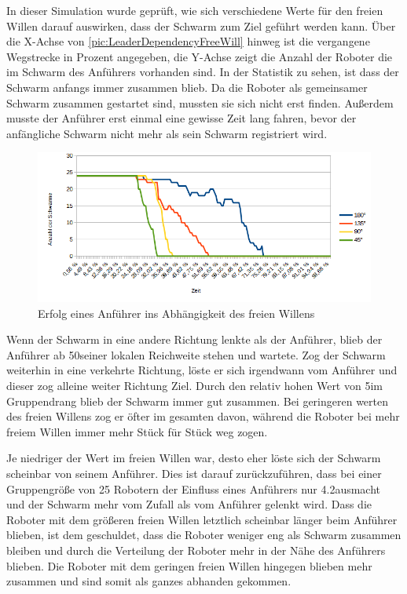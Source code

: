 In dieser Simulation wurde geprüft, wie sich verschiedene Werte für den freien Willen darauf auswirken, dass der Schwarm zum Ziel geführt werden kann. Über die X-Achse von \autoref{pic:LeaderDependencyFreeWill} hinweg ist die vergangene Wegstrecke in Prozent angegeben, die Y-Achse zeigt die Anzahl der Roboter die im Schwarm des Anführers vorhanden sind.
In der Statistik zu sehen, ist dass der Schwarm anfangs immer zusammen blieb. Da die Roboter als gemeinsamer Schwarm zusammen gestartet sind, mussten sie sich nicht erst finden. Außerdem musste der Anführer erst einmal eine gewisse Zeit lang fahren, bevor der anfängliche Schwarm nicht mehr als sein Schwarm registriert wird.

\begin{figure}[h]
	\includegraphics[width=\textwidth, keepaspectratio]{graphics/Statistics/Leader/DependencyFreeWill.png}
	\caption{Erfolg eines Anführer ins Abhängigkeit des freien Willens}
	\label{pic:LeaderDependencyFreeWill}
\end{figure}

Wenn der Schwarm in eine andere Richtung lenkte als der Anführer, blieb der Anführer ab 50\per seiner lokalen Reichweite stehen und wartete. Zog der Schwarm weiterhin in eine verkehrte Richtung, löste er sich irgendwann vom Anführer und dieser zog alleine weiter Richtung Ziel. Durch den relativ hohen Wert von 5\per im Gruppendrang blieb der Schwarm immer gut zusammen. Bei geringeren werten des freien Willens zog er öfter im gesamten davon, während die Roboter bei mehr freiem Willen immer mehr Stück für Stück weg zogen.

Je niedriger der Wert im freien Willen war, desto eher löste sich der Schwarm scheinbar von seinem Anführer. Dies ist darauf zurückzuführen, dass bei einer Gruppengröße von 25 Robotern der Einfluss eines Anführers nur 4.2\per ausmacht und der Schwarm mehr vom Zufall als vom Anführer gelenkt wird. Dass die Roboter mit dem größeren freien Willen letztlich scheinbar länger beim Anführer blieben, ist dem geschuldet, dass die Roboter weniger eng als Schwarm zusammen bleiben und durch die Verteilung der Roboter mehr in der Nähe des Anführers blieben. Die Roboter mit dem geringen freien Willen hingegen blieben mehr zusammen und sind somit als ganzes abhanden gekommen.

